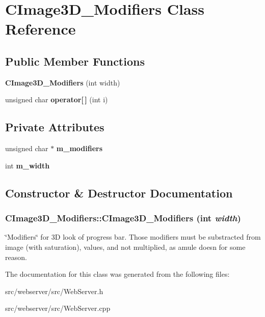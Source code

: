 \section{CImage3D\_\-Modifiers Class Reference}
\label{classCImage3D__Modifiers}
\subsection*{Public Member Functions}
\begin{DoxyCompactItemize}
\item 
{\bf CImage3D\_\-Modifiers} (int width)
\item 
unsigned char {\bfseries operator[$\,$]} (int i)\label{classCImage3D__Modifiers_a00a0493daa40b61d54ccecfcf5e8089e}

\end{DoxyCompactItemize}
\subsection*{Private Attributes}
\begin{DoxyCompactItemize}
\item 
unsigned char $\ast$ {\bfseries m\_\-modifiers}\label{classCImage3D__Modifiers_ae373a0f57496657bf484e94fe498ccb0}

\item 
int {\bfseries m\_\-width}\label{classCImage3D__Modifiers_a0cc4f0327b73f7bdc3057ae7c956220d}

\end{DoxyCompactItemize}


\subsection{Constructor \& Destructor Documentation}
\subsubsection[{CImage3D\_\-Modifiers}]{\setlength{\rightskip}{0pt plus 5cm}CImage3D\_\-Modifiers::CImage3D\_\-Modifiers (int {\em width})}\label{classCImage3D__Modifiers_a5513ffbf87699acb9d22809704cf55d2}
\char`\"{}Modifiers\char`\"{} for 3D look of progress bar. Those modifiers must be substracted from image (with saturation), values, and not multiplied, as amule doesn for some reason. 

The documentation for this class was generated from the following files:\begin{DoxyCompactItemize}
\item 
src/webserver/src/WebServer.h\item 
src/webserver/src/WebServer.cpp\end{DoxyCompactItemize}
